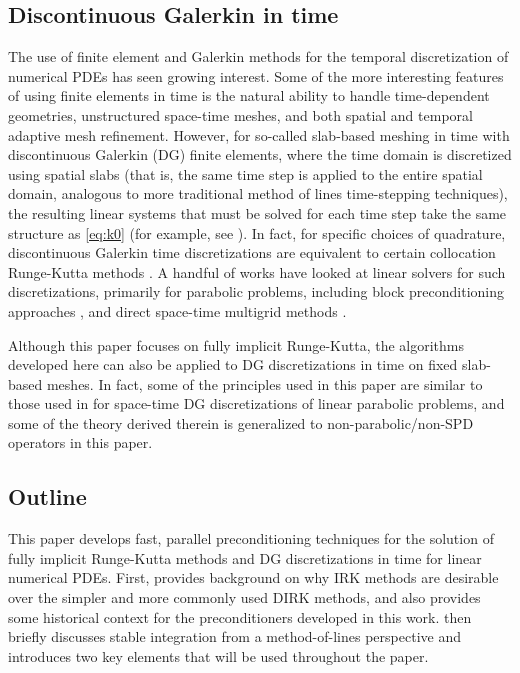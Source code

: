 \documentclass[review]{siamart}
\begin{document}
\subsection{Discontinuous Galerkin in time}\label{sec:intro:dg}

The use of finite element and Galerkin methods for the temporal discretization of numerical PDEs has seen growing interest.
Some of the more interesting features of using finite elements in time is the natural ability to handle time-dependent geometries, unstructured space-time meshes, and both spatial and temporal adaptive mesh refinement.
However, for so-called slab-based meshing in time with discontinuous Galerkin (DG) finite elements, where the time domain is discretized using spatial slabs (that is, the same time step is applied to the entire spatial domain, analogous to more traditional method of lines time-stepping techniques), the resulting linear systems that must be solved for each time step take the same structure as \eqref{eq:k0} (for example, see \cite{hn,Akrivis2011}).
In fact, for specific choices of quadrature, discontinuous Galerkin time discretizations are equivalent to certain collocation Runge-Kutta methods \cite{Lasaint1974}.
A handful of works have looked at linear solvers for such discretizations, primarily for parabolic problems, including block preconditioning approaches \cite{exh,8jp,27n}, and direct space-time multigrid methods \cite{gander2016analysis}.

Although this paper focuses on fully implicit Runge-Kutta, the algorithms developed here can also be applied to DG discretizations in time on fixed slab-based meshes.
In fact, some of the principles used in this paper are similar to those used in \cite{exh} for space-time DG discretizations of linear parabolic problems, and some of the theory derived therein is generalized to non-parabolic/non-SPD operators in this paper.

\subsection{Outline}\label{sec:intro:outline}

This paper develops fast, parallel preconditioning techniques for the solution of
fully implicit Runge-Kutta methods and DG discretizations in time
for linear numerical PDEs.
First,  provides background on why IRK methods are desirable
over the simpler and more commonly used DIRK methods, and also provides some
historical context for the preconditioners developed in this work.
 then briefly discusses stable integration from
a method-of-lines perspective and introduces two key elements that will be
used throughout the paper.
\end{document}
